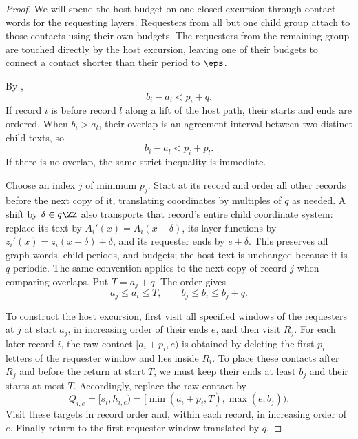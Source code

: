 \begin{proof}
We will spend the host budget on one closed excursion through contact words for the requesting layers. Requesters from all but one child group attach to those contacts using their own budgets. The requesters from the remaining group are touched directly by the host excursion, leaving one of their budgets to connect a contact shorter than their period to $\eps$.

By ,
\begin{equation}\label{eq:host-length}
b_i-a_i<p_i+q.
\end{equation}
If record $i$ is before record $l$ along a lift of the host path, their starts and ends are ordered. When $b_i>a_l$, their overlap is an agreement interval between two distinct child texts, so
\begin{equation}\label{eq:child-overlap}
b_i-a_l<p_i+p_l.
\end{equation}
If there is no overlap, the same strict inequality is immediate.

Choose an index $j$ of minimum $p_j$. Start at its record and order all other records before the next copy of it, translating coordinates by multiples of $q$ as needed. A shift by $\delta\in q\ZZ$ also transports that record's entire child coordinate system: replace its text by $A_i'(x)=A_i(x-\delta)$, its layer functions by $z_i'(x)=z_i(x-\delta)+\delta$, and its requester ends by $e+\delta$. This preserves all graph words, child periods, and budgets; the host text is unchanged because it is $q$-periodic. The same convention applies to the next copy of record $j$ when comparing overlaps. Put $T=a_j+q$. The order gives
\begin{equation}\label{eq:host-order}
a_j\le a_i\le T,\qquad b_j\le b_i\le b_j+q.
\end{equation}

To construct the host excursion, first visit all specified windows of the requesters at $j$ at start $a_j$, in increasing order of their ends $e$, and then visit $R_j$. For each later record $i$, the raw contact $[a_i+p_i,e)$ is obtained by deleting the first $p_i$ letters of the requester window and lies inside $R_i$. To place these contacts after $R_j$ and before the return at start $T$, we must keep their ends at least $b_j$ and their starts at most $T$. Accordingly, replace the raw contact by
\begin{equation}\label{eq:host-target}
Q_{i,e}=[s_i,h_{i,e})
=[\min(a_i+p_i,T),\max(e,b_j)).
\end{equation}
Visit these targets in record order and, within each record, in increasing order of $e$. Finally return to the first requester window translated by $q$.


\end{proof}
